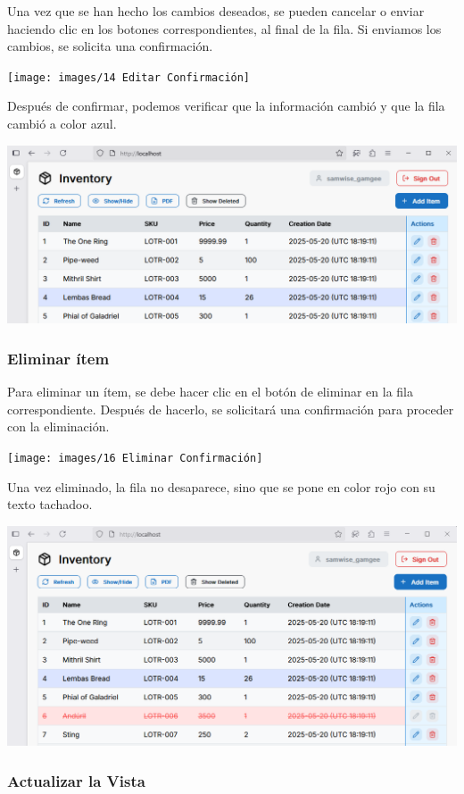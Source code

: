 Una vez que se han hecho los cambios deseados, se pueden cancelar o enviar haciendo clic en los botones correspondientes, al final de la fila. Si enviamos los cambios, se solicita una confirmación.

\texttt{[image: images/14 Editar Confirmación]}

Después de confirmar, podemos verificar que la información cambió y que la fila cambió a color azul.

\includegraphics[width=\textwidth]{images/15 Fila Editada}

\subsubsection{Eliminar ítem}

Para eliminar un ítem, se debe hacer clic en el botón de eliminar en la fila correspondiente. Después de hacerlo, se solicitará una confirmación para proceder con la eliminación.

\texttt{[image: images/16 Eliminar Confirmación]}

Una vez eliminado, la fila no desaparece, sino que se pone en color rojo con su texto tachadoo.

\includegraphics[width=\textwidth]{images/17 Fila Eliminada}

\subsubsection{Actualizar la Vista}

